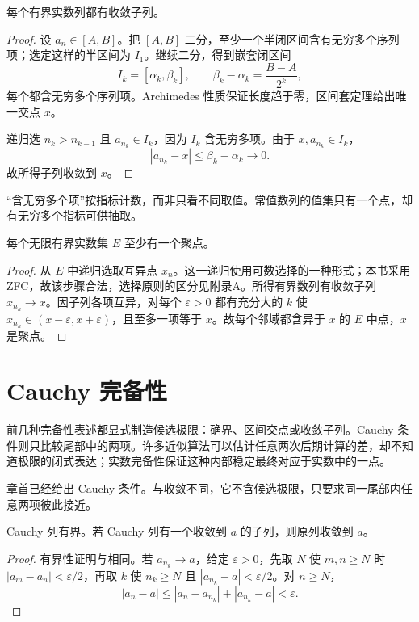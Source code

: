 \begin{theorem}
每个有界实数列都有收敛子列。
\end{theorem}

\begin{proof}
设 \(a_n\in[A,B]\)。把 \([A,B]\) 二分，至少一个半闭区间含有无穷多个序列项；选定这样的半区间为 \(I_1\)。继续二分，得到嵌套闭区间
\[
 I_k=[\alpha_k,\beta_k],\qquad
 \beta_k-\alpha_k=\frac{B-A}{2^k},
\]
每个都含无穷多个序列项。Archimedes 性质保证长度趋于零，区间套定理给出唯一交点 \(x\)。

递归选 \(n_k>n_{k-1}\) 且 \(a_{n_k}\in I_k\)，因为 \(I_k\) 含无穷多项。由于 \(x,a_{n_k}\in I_k\)，
\[
 |a_{n_k}-x|\le\beta_k-\alpha_k\longrightarrow0.
\]
故所得子列收敛到 \(x\)。
\end{proof}

“含无穷多个项”按指标计数，而非只看不同取值。常值数列的值集只有一个点，却有无穷多个指标可供抽取。

\begin{corollary}[有界无限集的聚点]
每个无限有界实数集 \(E\) 至少有一个聚点。
\end{corollary}

\begin{proof}
从 \(E\) 中递归选取互异点 \(x_n\)。这一递归使用可数选择的一种形式；本书采用 ZFC，故该步骤合法，选择原则的区分见附录A。所得有界数列有收敛子列 \(x_{n_k}\to x\)。因子列各项互异，对每个 \(\varepsilon>0\) 都有充分大的 \(k\) 使 \(x_{n_k}\in(x-\varepsilon,x+\varepsilon)\)，且至多一项等于 \(x\)。故每个邻域都含异于 \(x\) 的 \(E\) 中点，\(x\) 是聚点。
\end{proof}

\section{Cauchy 完备性}

前几种完备性表述都显式制造候选极限：确界、区间交点或收敛子列。Cauchy 条件则只比较尾部中的两项。许多近似算法可以估计任意两次后期计算的差，却不知道极限的闭式表达；实数完备性保证这种内部稳定最终对应于实数中的一点。


章首已经给出 Cauchy 条件。与收敛不同，它不含候选极限，只要求同一尾部内任意两项彼此接近。

\begin{proposition}
Cauchy 列有界。若 Cauchy 列有一个收敛到 \(a\) 的子列，则原列收敛到 \(a\)。
\end{proposition}

\begin{proof}
有界性证明与相同。若 \(a_{n_k}\to a\)，给定 \(\varepsilon>0\)，先取 \(N\) 使 \(m,n\ge N\) 时 \(|a_m-a_n|<\varepsilon/2\)，再取 \(k\) 使 \(n_k\ge N\) 且 \(|a_{n_k}-a|<\varepsilon/2\)。对 \(n\ge N\)，
\[
 |a_n-a|\le|a_n-a_{n_k}|+|a_{n_k}-a|<\varepsilon.
\]
\end{proof}

